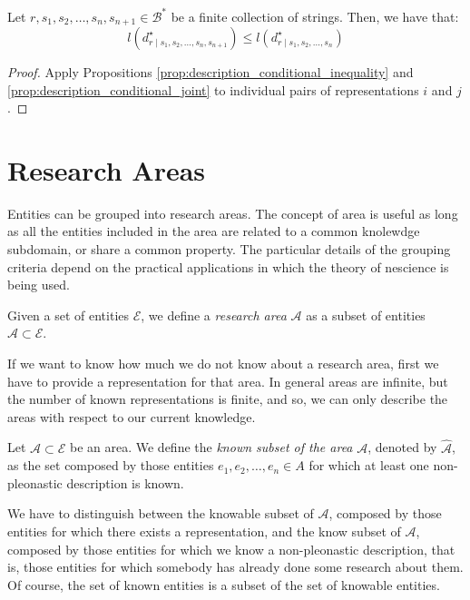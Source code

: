 \begin{proposition}
Let $r, s_1, s_2, \ldots, s_n, s_{n+1} \in \mathcal{B}^\ast$ be a finite collection of strings. Then, we have that:
\[
l \left( d^\star_{r \mid s_1, s_2, \ldots, s_n, s_{n+1}} \right) \leq l \left( d^\star_{r \mid s_1, s_2, \ldots, s_n} \right)
\]
\end{proposition}
\begin{proof}
Apply Propositions \ref{prop:description_conditional_inequality} and \ref{prop:description_conditional_joint} to individual pairs of representations $i$ and $j$.
\end{proof}

%
%

\section{Research Areas}
\label{sec:areas}

Entities can be grouped into research areas. The concept of area is useful as long as all the entities included in the area are related to a common knolewdge subdomain, or share a common property. The particular details of the grouping criteria depend on the practical applications in which the theory of nescience is being used.

\begin{definition}
Given a set of entities $\mathcal{E}$, we define a \emph{research area} $\mathcal{A}$ as a subset of entities $\mathcal{A} \subset \mathcal{E}$.
\end{definition}

If we want to know how much we do not know about a research area, first we have to provide a representation for that area. In general areas are infinite, but the number of known representations is finite, and so, we can only describe the areas with respect to our current knowledge.

\begin{definition}
Let $\mathcal{A} \subset \mathcal{E}$ be an area. We define the \emph{known subset of the area} $\mathcal{A}$, denoted by $\hat{\mathcal{A}}$, as the set composed by those entities $e_1, e_2, \ldots, e_n \in A$ for which at least one non-pleonastic description is known.
\end{definition}

We have to distinguish between the knowable subset of $\mathcal{A}$, composed by those entities for which there exists a representation, and the know subset of $\mathcal{A}$, composed by those entities for which we know a non-pleonastic description, that is, those entities for which somebody has already done some research about them. Of course, the set of known entities is a subset of the set of knowable entities.

